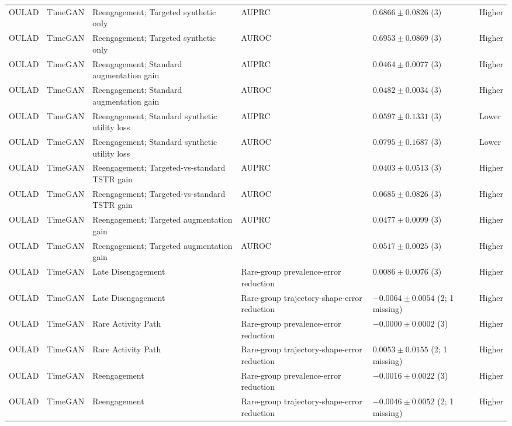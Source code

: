 \begin{longtable}{@{}p{2.25cm}p{2.05cm}p{4.7cm}p{5.0cm}p{2.6cm}p{1.25cm}@{}}
OULAD & TimeGAN & Reengagement; Targeted synthetic only & AUPRC & $0.6866 \mathbin{\pm} 0.0826$ (3) & Higher \\
OULAD & TimeGAN & Reengagement; Targeted synthetic only & AUROC & $0.6953 \mathbin{\pm} 0.0869$ (3) & Higher \\
OULAD & TimeGAN & Reengagement; Standard augmentation gain & AUPRC & $0.0464 \mathbin{\pm} 0.0077$ (3) & Higher \\
OULAD & TimeGAN & Reengagement; Standard augmentation gain & AUROC & $0.0482 \mathbin{\pm} 0.0034$ (3) & Higher \\
OULAD & TimeGAN & Reengagement; Standard synthetic utility loss & AUPRC & $0.0597 \mathbin{\pm} 0.1331$ (3) & Lower \\
OULAD & TimeGAN & Reengagement; Standard synthetic utility loss & AUROC & $0.0795 \mathbin{\pm} 0.1687$ (3) & Lower \\
OULAD & TimeGAN & Reengagement; Targeted-vs-standard TSTR gain & AUPRC & $0.0403 \mathbin{\pm} 0.0513$ (3) & Higher \\
OULAD & TimeGAN & Reengagement; Targeted-vs-standard TSTR gain & AUROC & $0.0685 \mathbin{\pm} 0.0826$ (3) & Higher \\
OULAD & TimeGAN & Reengagement; Targeted augmentation gain & AUPRC & $0.0477 \mathbin{\pm} 0.0099$ (3) & Higher \\
OULAD & TimeGAN & Reengagement; Targeted augmentation gain & AUROC & $0.0517 \mathbin{\pm} 0.0025$ (3) & Higher \\
OULAD & TimeGAN & Late Disengagement & Rare-group prevalence-error reduction & $0.0086 \mathbin{\pm} 0.0076$ (3) & Higher \\
OULAD & TimeGAN & Late Disengagement & Rare-group trajectory-shape-error reduction & $-0.0064 \mathbin{\pm} 0.0054$ (2; 1 missing) & Higher \\
OULAD & TimeGAN & Rare Activity Path & Rare-group prevalence-error reduction & $-0.0000 \mathbin{\pm} 0.0002$ (3) & Higher \\
OULAD & TimeGAN & Rare Activity Path & Rare-group trajectory-shape-error reduction & $0.0053 \mathbin{\pm} 0.0155$ (2; 1 missing) & Higher \\
OULAD & TimeGAN & Reengagement & Rare-group prevalence-error reduction & $-0.0016 \mathbin{\pm} 0.0022$ (3) & Higher \\
OULAD & TimeGAN & Reengagement & Rare-group trajectory-shape-error reduction & $-0.0046 \mathbin{\pm} 0.0052$ (2; 1 missing) & Higher \\
\end{longtable}
